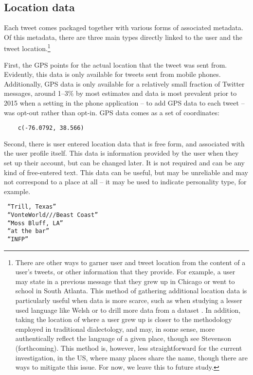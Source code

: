 \documentclass[output=paper,colorlinks,citecolor=brown,draftmode]{langscibook}
\begin{document}
\subsection{Location data}\label{sec.loc}
\largerpage
Each tweet comes packaged together with various forms of associated metadata. Of this metadata, there are three main types directly linked to the user and the tweet location.\footnote{There are other ways to garner user and tweet location from the content of a user’s tweets, or other information that they provide. For example, a user may state in a previous message that they grew up in Chicago or went to school in South Atlanta. This method of gathering additional location data is particularly useful when data is more scarce, such as when studying a lesser used language like Welsh \citep{willis2020} or to drill more data from a dataset \citep{gopal2021}. In addition, taking the location of where a user grew up is closer to the methodology employed in traditional dialectology, and may, in some sense, more authentically reflect the language of a given place, though see Stevenson (forthcoming). This method is, however,  less straightforward for the current investigation, in the US, where many places share the name, though there are ways to mitigate this issue. For now, we leave this to future study.}

First, the GPS points for the actual location that the tweet was sent from. Evidently, this data is only available for tweets sent from mobile phones. Additionally, GPS data is only available for a relatively small fraction of Twitter messages, around 1--3\% by most estimates and data is most prevalent prior to 2015 when a setting in the phone application -- to add GPS data to each tweet -- was opt-out rather than opt-in. GPS data comes as a set of coordinates:

\begin{verbatim}
    c(-76.0792, 38.566)
\end{verbatim}

Second, there is user entered location data that is free form, and associated with the user profile itself. This data is information provided by the user when they set up their account, but can be changed later. It is not required and can be any kind of free-entered text. This data can be useful, but may be unreliable and may not correspond to a place at all -- it may be used to indicate personality type, for example.

\begin{verbatim}
 “Trill, Texas” 
 “VonteWorld///Beast Coast” 
 “Moss Bluff, LA” 
 “at the bar” 
 “INFP”   
\end{verbatim}
\end{document}
